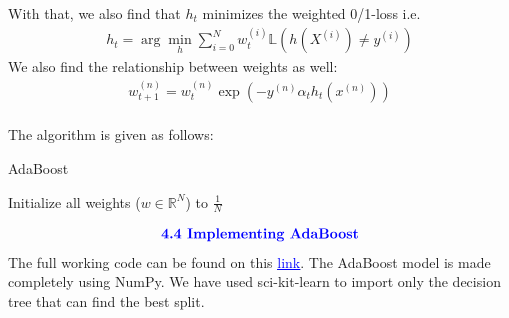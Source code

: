 \documentclass{homework}
\begin{document}
 With that, we also find that $h_t$ minimizes the weighted 0/1-loss i.e.
 \begin{align*}
    h_t = \arg \min_{h} \sum_{i=0}^{N} w^{(i)}_t \mathbb{L}(h(X^{(i)}) \neq y^{(i)})
 \end{align*}
 We also find the relationship between weights as well:
 \begin{align*}
    w_{t+1}^{(n)} = w_t^{(n)} \exp(-y^{(n)}\alpha_t h_t(x^{(n)}))
 \end{align*}
 \\
The algorithm is given as follows:
\begin{algorithm*}
    \caption{AdaBoost}
    Initialize all weights ($w \in \mathbb{R}^N$) to $\frac{1}{N}$ \\
\end{algorithm*}

\begin{align*}
    \textcolor{blue}{ \text{{\textbf{4.4 Implementing AdaBoost}}}}
 \end{align*}
 The full working code can be found on this \href{https://github.com/Anshul-Sangrame/Handouts-2022-2023/blob/main/Boosting%20and%20bagging/code/Adaboost/main.ipynb}{\textcolor{blue}{\underline{link}}}. The AdaBoost model is made completely using NumPy. We have used sci-kit-learn to import only the decision tree that can find the best split.
 
\end{document}
